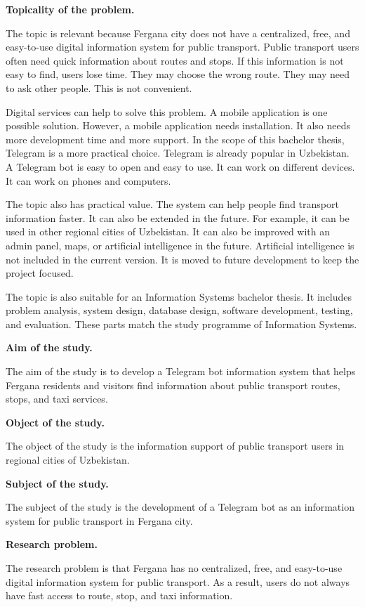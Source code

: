 \textbf{Topicality of the problem.}

The topic is relevant because Fergana city does not have a centralized, free, and easy-to-use digital information system for public transport. Public transport users often need quick information about routes and stops. If this information is not easy to find, users lose time. They may choose the wrong route. They may need to ask other people. This is not convenient.

Digital services can help to solve this problem. A mobile application is one possible solution. However, a mobile application needs installation. It also needs more development time and more support. In the scope of this bachelor thesis, Telegram is a more practical choice. Telegram is already popular in Uzbekistan. A Telegram bot is easy to open and easy to use. It can work on different devices. It can work on phones and computers.

The topic also has practical value. The system can help people find transport information faster. It can also be extended in the future. For example, it can be used in other regional cities of Uzbekistan. It can also be improved with an admin panel, maps, or artificial intelligence in the future. Artificial intelligence is not included in the current version. It is moved to future development to keep the project focused.

The topic is also suitable for an Information Systems bachelor thesis. It includes problem analysis, system design, database design, software development, testing, and evaluation. These parts match the study programme of Information Systems.

\textbf{Aim of the study.}

The aim of the study is to develop a Telegram bot information system that helps Fergana residents and visitors find information about public transport routes, stops, and taxi services.

\textbf{Object of the study.}

The object of the study is the information support of public transport users in regional cities of Uzbekistan.

\textbf{Subject of the study.}

The subject of the study is the development of a Telegram bot as an information system for public transport in Fergana city.

\textbf{Research problem.}

The research problem is that Fergana has no centralized, free, and easy-to-use digital information system for public transport. As a result, users do not always have fast access to route, stop, and taxi information.

